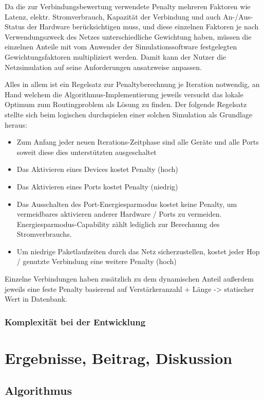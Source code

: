 \documentclass[12pt,titlepage]{article}
\begin{document}
Da die zur Verbindungsbewertung verwendete Penalty mehreren Faktoren wie Latenz, elektr. Stromverbrauch, Kapazität der Verbindung und auch An-/Aus-Status der Hardware berücksichtigen muss, und diese einzelnen Faktoren je nach Verwendungszweck des Netzes unterschiedliche Gewichtung haben, müssen die einzelnen Anteile mit vom Anwender der Simulationssoftware festgelegten Gewichtungsfaktoren multipliziert werden. Damit kann der Nutzer die Netzsimulation auf seine Anforderungen ansatzweise anpassen.

Alles in allem ist ein Regelsatz zur Penaltyberechnung je Iteration notwendig, an Hand welchem die Algorithmus-Implementierung jeweils versucht das lokale Optimum zum Routingproblem als Lösung zu finden.
Der folgende Regelsatz stellte sich beim logischen durchspielen einer solchen Simulation als Grundlage heraus:
\begin{itemize}
\item Zum Anfang jeder neuen Iterations-Zeitphase sind alle Geräte und alle Ports soweit diese dies unterstützten ausgeschaltet
\item Das Aktivieren eines Devices kostet Penalty (hoch)
\item Das Aktivieren eines Ports kostet Penalty (niedrig)
\item Das Ausschalten des Port-Energiesparmodus kostet keine Penalty, um vermeidbares aktivieren anderer Hardware / Ports zu vermeiden. Energiesparmodus-Capability zählt lediglich zur Berechnung des Stromverbrauchs.
\item Um niedrige Paketlaufzeiten durch das Netz sicherzustellen, kostet jeder Hop / genutzte Verbindung eine weitere Penalty (hoch)
\end{itemize}
Einzelne Verbindungen haben zusätzlich zu dem dynamischen Anteil außerdem jeweils eine feste Penalty basierend auf Verstärkeranzahl + Länge -> statischer Wert in Datenbank.


\subsubsection{Komplexität bei der Entwicklung}

\section{Ergebnisse, Beitrag, Diskussion}
\subsection{Algorithmus}
\end{document}
